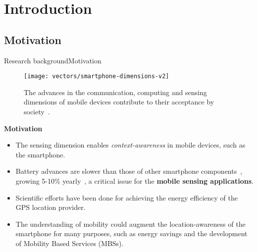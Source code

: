 \section{Introduction}
\subsection{Motivation}
\begin{frame}{Research background}{Motivation}
\begin{figure}[tb]
  \centering
  \texttt{[image: vectors/smartphone-dimensions-v2]}
  \caption{The advances in the communication, computing and sensing dimensions of mobile devices contribute to their acceptance by society~\cite{Islam2014}.}  
\end{figure}

\begin{block}{\small \textbf{Motivation}}
{
  \small
\begin{itemize}
  \item The sensing dimension enables \emph{context-awareness} in mobile devices, such as the smartphone.
  \item Battery advances are slower than those of other smartphone components~\cite{Kjaergaard2012}, growing 5-10\% yearly~\cite{Ma2012,Evarts2015}, a critical issue for the \textbf{mobile sensing applications}.
  \item Scientific efforts have been done for achieving the energy efficiency of the GPS location provider.
  \item The understanding of mobility could augment the location-awareness of the smartphone for many purposes, such as energy savings and the development of Mobility Based Services (MBSs).
\end{itemize}
}
\end{block}
\end{frame}

